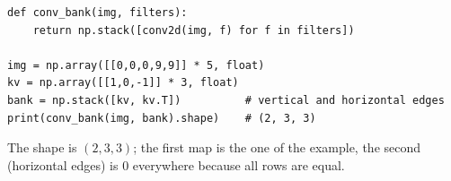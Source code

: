 \begin{enumerate}[label=\textbf{\ansnum.\arabic*}]
\begin{verbatim}
def conv_bank(img, filters):
    return np.stack([conv2d(img, f) for f in filters])

img = np.array([[0,0,0,9,9]] * 5, float)
kv = np.array([[1,0,-1]] * 3, float)
bank = np.stack([kv, kv.T])          # vertical and horizontal edges
print(conv_bank(img, bank).shape)    # (2, 3, 3)
\end{verbatim}
  The shape is $(2,3,3)$; the first map is the one of the example, the second (horizontal edges) is $0$ everywhere because all rows are equal.
\end{enumerate}
